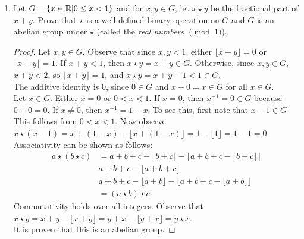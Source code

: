 \begin{enumerate}
\begin{sln}
\begin{enumerate}
\begin{proof}
					\end{proof}
				\item This is not a group.
					\begin{proof}
						We will show the group is not closed under the operation.
						\[\frac{1}{3} + \frac{1}{2} = \frac{5}{6}\notin G\]
					\end{proof}
			\end{enumerate}
		\end{sln}
		\item Let $G=\left\{x\in\mathbb{R}|0\leq x<1 \right\}$ and for $x,y\in G$, let $x\star y$ be the fractional part of $x+y$.  Prove that $\star$ is a well defined binary operation on $G$ and $G$ is an abelian group under $\star$ (called the \emph{real numbers $\pmod 1$}).
		\begin{proof}
			Let $x,y\in G$.  Observe that since $x,y<1$, either $\lfloor x+y \rfloor = 0$ or $\lfloor x+y \rfloor =1$.  If $x+y<1$, then $x\star y = x+y \in G$.  Otherwise, since $x,y\in G$, $x+y<2$, so $\lfloor x+y \rfloor = 1$, and $x\star y = x+y - 1 <1 \in G$.\\
			The additive identity is $0$, since $0\in G$ and $x+0 = x\in G$ for all $x\in G$.\\
			Let $x\in G$.  Either $x=0$ or $0<x<1$.  If $x=0$, then $x^{-1} = 0\in G$ because $0+0=0$.  If $x\neq 0$, then $x^{-1} = 1-x$.  To see this, first note that $x-1\in G$  This follows from $0<x<1$.  Now observe $x\star (x-1) = x+(1-x) - \lfloor x+(1-x)\rfloor = 1-\lfloor 1\rfloor = 1-1 = 0$.
			Associativity can be shown as follows:
			\begin{align*}
				a\star (b \star c) &= a+b+c-\lfloor b + c \rfloor - \lfloor a+b+c - \lfloor b+c\rfloor\rfloor\\
				& a+b+c-\lfloor a+b+c\rfloor\\
				& a+b+c-\lfloor a + b \rfloor -\lfloor a+b+c-\lfloor a+b\rfloor\rfloor\\
				& = (a\star b)\star c
			\end{align*}  
			Commutativity holds over all integers.  Observe that $x\star y = x+y - \lfloor x+y\rfloor = y+x - \lfloor y+x\rfloor = y\star x$.\\
			It is proven that this is an abelian group.
			

\end{proof}
\end{enumerate}
